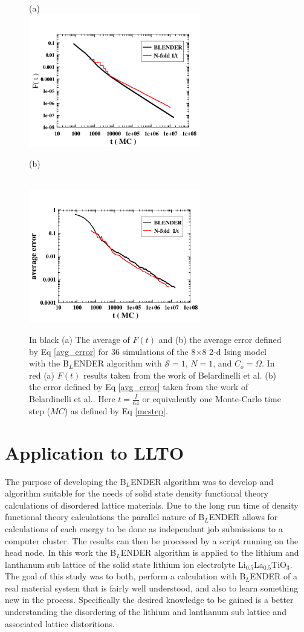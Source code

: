 \documentclass[aps,prl,reprint,superscriptaddress,showkeys]{revtex4-1}
\begin{document}
\begin{figure}
(a)\\
\includegraphics[width=7.5cm]{./figures/Avg_F_8X8.png}
\centerline{(b)}\\
\includegraphics[width=7.5cm]{./figures/Avg_error_8X8.png}
\caption{ In black (a) The average of $F(t)$ and (b) the average error defined by Eq \ref{avg_error}  for 36 simulations of the 8$\times$8 2-d Ising model with the B$_L$ENDER algorithm with $\mathcal{S}=1$, $N=1$, and $C_o = \Omega$. In red (a) $F(t)$ results taken from the work of Belardinelli et al. \cite{saturation} (b) the error defined by Eq \ref{avg_error} taken from the  work of Belardinelli et al.. Here $t = \frac{I}{64}$ or equivalently one Monte-Carlo time step ($MC$) as defined by Eq \ref{mcstep}.\label{FtandA} }
\end{figure}

\section{Application to LLTO}
The purpose of developing the B$_L$ENDER algorithm was to develop and algorithm suitable for the needs of solid state density functional theory calculations of disordered lattice materials.  Due to the long run time of density functional theory calculations  the parallel nature of B$_L$ENDER allows for calculations of each energy to be done as independant job submissions to a computer cluster. The results can then be processed by a script running on the head node.  In this work the B$_L$ENDER algorithm is applied to the lithium and lanthanum sub lattice of the solid state lithium ion electrolyte  Li$_{0.5}$La$_{0.5}$TiO$_{3}$. The goal of this study was to both, perform a calculation with B$_L$ENDER of a real material system that is fairly well understood, and also to learn something new in the process.  Specifically the desired knowledge to be gained is a better understanding the disordering of the lithium and lanthanum sub lattice and associated lattice distoritions. 
\end{document}
